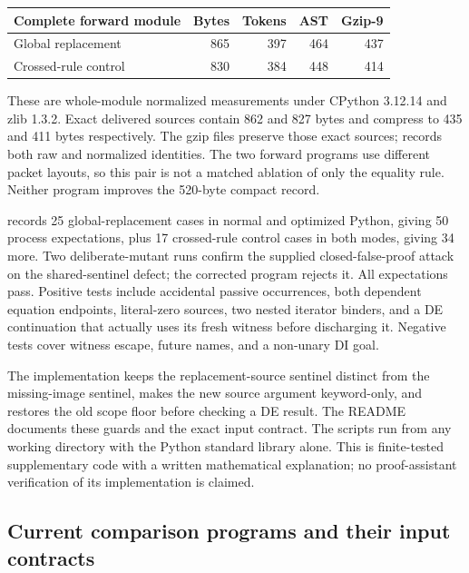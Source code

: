 \documentclass[11pt,letterpaper]{article}
\theoremstyle{definition}
\theoremstyle{remark}
\newcommand{\code}[1]{\texttt{\detokenize{#1}}}
\begin{document}
\begin{center}\small
\begin{tabular}{@{}lrrrr@{}}
\toprule
Complete forward module & Bytes & Tokens & AST & Gzip-9\\
\midrule
Global replacement &865&397&464&437\\
Crossed-rule control &830&384&448&414\\
\bottomrule
\end{tabular}
\end{center}
These are whole-module normalized measurements under CPython 3.12.14 and
zlib 1.3.2. Exact delivered sources contain 862 and 827 bytes and compress
to 435 and 411 bytes respectively. The gzip files preserve those exact
sources; \code{compact/metrics.json} records both raw and normalized
identities. The two forward programs use different packet layouts, so
this pair is not a matched ablation of only the equality rule. Neither
program improves the 520-byte compact record.

\code{compact/verify.py} records 25 global-replacement cases in normal
and optimized Python, giving 50 process expectations, plus 17 crossed-rule
control cases in both modes, giving 34 more. Two deliberate-mutant runs
confirm the supplied closed-false-proof attack on the shared-sentinel
defect; the corrected program rejects it. All expectations pass. Positive
tests include accidental passive occurrences, both dependent equation
endpoints, literal-zero sources, two nested iterator binders, and a DE
continuation that actually uses its fresh witness before discharging it.
Negative tests cover witness escape, future names, and a non-unary DI goal.

The implementation keeps the replacement-source sentinel distinct from
the missing-image sentinel, makes the new source argument keyword-only,
and restores the old scope floor before checking a DE result. The README
documents these guards and the exact input contract. The scripts run from
any working directory with the Python standard library alone. This is
finite-tested supplementary code with a written mathematical explanation;
no proof-assistant verification of its implementation is claimed.



\subsection{Current comparison programs and their input contracts}
\end{document}
